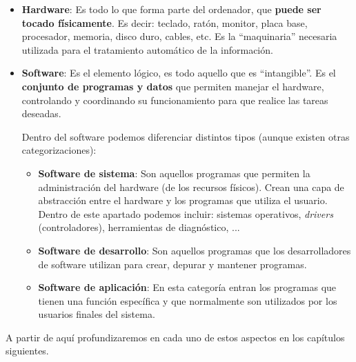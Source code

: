 \begin{itemize}
    \item \textbf{Hardware}: Es todo lo que forma parte del ordenador, que \textbf{puede ser tocado físicamente}. Es decir: teclado, ratón, monitor, placa base, procesador, memoria, disco duro, cables, etc. Es la “maquinaria” necesaria utilizada para el tratamiento automático de la información.

    \item \textbf{Software}: Es el elemento lógico, es todo aquello que es “intangible”. Es el \textbf{conjunto de programas y datos} que permiten manejar el hardware, controlando y coordinando su funcionamiento para que realice las tareas deseadas.

    Dentro del software podemos diferenciar distintos tipos (aunque existen otras categorizaciones):

    \begin{itemize}
        \item \textbf{Software de sistema}: Son aquellos programas que permiten la administración del hardware (de los recursos físicos). Crean una capa de abstracción entre el hardware y los programas que utiliza el usuario. Dentro de este apartado podemos incluir: sistemas operativos, \textit{drivers} (controladores), herramientas de diagnóstico, ...

        \item \textbf{Software de desarrollo}: Son aquellos programas que los desarrolladores de software utilizan para crear, depurar y mantener programas.

        \item \textbf{Software de aplicación}: En esta categoría entran los programas que tienen una función específica y que normalmente son utilizados por los usuarios finales del sistema.
    \end{itemize}

\end{itemize}

A partir de aquí profundizaremos en cada uno de estos aspectos en los capítulos siguientes.